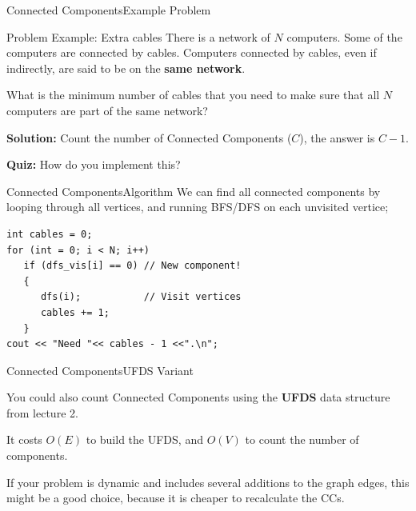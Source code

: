 \begin{frame}{Connected Components}{Example Problem}
  \begin{block}{Problem Example: Extra cables}
    There is a network of $N$ computers. Some of the computers are connected by cables. Computers connected by cables, even if indirectly, are said to be on the {\bf same network}.
    \bigskip

    What is the minimum number of cables that you need to make sure that all $N$ computers are part of the same network?
  \end{block}\bigskip

  {\bf Solution:} Count the number of Connected Components ($C$), the answer is $C-1$.\bigskip

  {\bf Quiz:} How do you implement this?
\end{frame}

\begin{frame}[fragile]{Connected Components}{Algorithm}
  We can find all connected components by looping through all vertices, and running BFS/DFS on each unvisited vertice;

  \begin{exampleblock}{}
\begin{verbatim}
int cables = 0;
for (int = 0; i < N; i++)
   if (dfs_vis[i] == 0) // New component!
   {
      dfs(i);           // Visit vertices
      cables += 1;
   }
cout << "Need "<< cables - 1 <<".\n";
\end{verbatim}
  \end{exampleblock}

\begin{center}
\end{center}
\end{frame}

\begin{frame}[fragile]{Connected Components}{UFDS Variant}

  You could also count Connected Components using the {\bf UFDS} data structure from lecture 2.\bigskip

  It costs $O(E)$ to build the UFDS, and $O(V)$ to count the number of components.\bigskip

  If your problem is dynamic and includes several additions to the graph edges, this might be a good choice, because it is cheaper to recalculate the CCs.
\end{frame}

